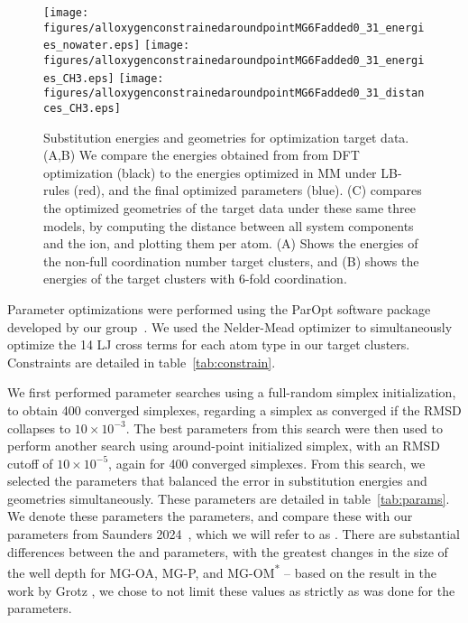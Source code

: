 \begin{figure}
    \caption[Substitution energies, and optimized geometries]{Substitution energies and geometries for optimization target data. (A,B) We compare the
        energies obtained from from DFT optimization (black) to the energies optimized in MM under LB-rules (red), and the
    final optimized parameters (blue). (C) compares the optimized geometries of the target data under these same three models,
by computing the distance between all system components and the ion, and plotting them per atom. (A) Shows the energies of the
non-full coordination number target clusters, and (B) shows the energies of the target clusters with 6-fold coordination.}
    \label{fig:optres}
    \texttt{[image: figures/alloxygenconstrainedaroundpointMG6Fadded0\_31\_energies\_nowater.eps]}
    \hspace{1em}
    \texttt{[image: figures/alloxygenconstrainedaroundpointMG6Fadded0\_31\_energies\_CH3.eps]}
    \hspace{1em}
    \texttt{[image: figures/alloxygenconstrainedaroundpointMG6Fadded0\_31\_distances\_CH3.eps]}
    \hspace{1em}
\end{figure}
Parameter optimizations were performed using the ParOpt software package developed by our group~\cite{fogarty:2014:paropt}. We used the Nelder-Mead optimizer to simultaneously optimize
the 14 LJ cross terms for each atom type in our target clusters. Constraints are detailed in table~\ref{tab:constrain}.

We first performed parameter searches using a full-random simplex initialization,
to obtain 400 converged simplexes, regarding a simplex as converged if the RMSD collapses to $10\times{}10^{-3}$. The best parameters from this search were then used
to perform another search using around-point initialized simplex, with an RMSD cutoff of $10\times{}10^{-5}$, again for 400 converged simplexes. From this search, we selected the parameters that balanced
the error in substitution energies and geometries simultaneously.
These parameters are detailed in table~\ref{tab:params}. We denote these parameters the  parameters, and compare these with our parameters from
Saunders \etal{} 2024~\cite{saunders:2024}, which we will refer to as .
There are substantial differences between the  and  parameters, with the greatest changes in the size of the well depth \epsilonij{} for MG-OA, MG-P, and MG-OM\textsuperscript{*} -- based on the
result in the work by Grotz \etal{}\cite{grotz:2021:optimized}, we chose to not limit these values as strictly as was done for the  parameters.

